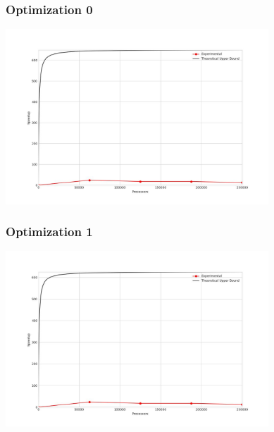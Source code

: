 \subsubsection{Optimization 0}
\begin{center}
    \resizebox{0.8\textwidth}{!}{}
    \includegraphics[width=0.74\textwidth]{../img/speedup-graph_type-random-250000-O0}
\end{center}

\subsubsection{Optimization 1}
\begin{center}
    \resizebox{0.8\textwidth}{!}{}
    \includegraphics[width=0.74\textwidth]{../img/speedup-graph_type-random-250000-O1}
\end{center}

\clearpage
